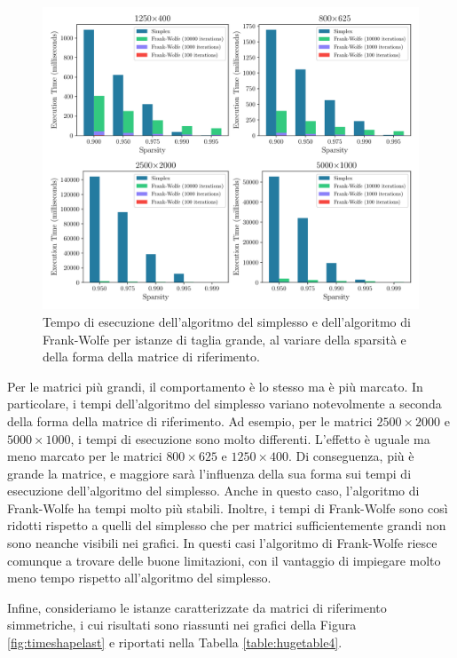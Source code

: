 \begin{figure}[!ht]
    \centering
    \includegraphics[width=\textwidth]{assets/figures/timeshape2.pdf}
    \caption{Tempo di esecuzione dell'algoritmo del simplesso e dell'algoritmo di Frank-Wolfe per istanze di taglia
    grande, al variare della sparsità e della forma della matrice di riferimento.}
    \label{fig:timeshape2}
\end{figure}

Per le matrici più grandi, il comportamento è lo stesso ma è più marcato. In particolare, i tempi dell'algoritmo del
simplesso variano notevolmente a seconda della forma della matrice di riferimento. Ad esempio, per le matrici \(
2500\times 2000 \) e \( 5000\times 1000\), i tempi di esecuzione sono molto differenti. L'effetto è uguale ma meno
marcato per le matrici \( 800\times 625 \) e \( 1250\times 400 \). Di conseguenza, più è grande la matrice, e maggiore
sarà l'influenza della sua forma sui tempi di esecuzione dell'algoritmo del simplesso. Anche in questo caso, l'algoritmo
di Frank-Wolfe ha tempi molto più stabili. Inoltre, i tempi di Frank-Wolfe sono così ridotti rispetto a quelli del
simplesso che per matrici sufficientemente grandi non sono neanche visibili nei grafici. In questi casi l'algoritmo di
Frank-Wolfe riesce comunque a trovare delle buone limitazioni, con il vantaggio di impiegare molto meno tempo rispetto
all'algoritmo del simplesso.

Infine, consideriamo le istanze caratterizzate da matrici di riferimento simmetriche, i cui risultati sono riassunti nei
grafici della Figura \ref{fig:timeshapelast} e riportati nella Tabella \ref{table:hugetable4}.

